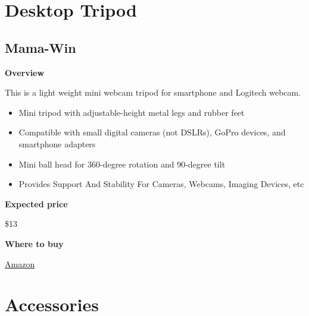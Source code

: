 \section{Desktop Tripod}
\label{sec:equipment::tripod}

\subsection{Mama-Win}
\label{sec:equipment::tripod::mamawin}

\begin{gram}
\label{grm:equipment::tripod::mamawin::main}

\textbf{Overview}

This is a light weight mini webcam tripod for smartphone and Logitech webcam.
%
\begin{itemize}
\item
Mini tripod with adjustable-height metal legs and rubber feet

\item
Compatible with small digital cameras (not DSLRs), GoPro devices, and smartphone adapters 

\item
Mini ball head for 360-degree rotation and 90-degree tilt

\item
Provides Support And Stability For Cameras, Webcams, Imaging Devices, etc

\end{itemize}



\textbf{Expected price}

\$13

\textbf{Where to buy}

\href{https://www.amazon.com/Lightweight-Webcam-Tripod-Logitech-Camera/dp/B076SHC6RN/ref=sr_1_1_sspa?crid=2T6CQ3HNRR1XR&keywords=logitech+c920&qid=1582900721&s=electronics&sprefix=logitech+c,electronics,172&sr=1-1-spons&psc=1&spLa=ZW5jcnlwdGVkUXVhbGlmaWVyPUE1VjVUUFpKTU83QUkmZW5jcnlwdGVkSWQ9QTA1NTk1OTVLT1IyTzdRRFVEWkImZW5jcnlwdGVkQWRJZD1BMDEyNzk2NzEyTDVSOEdSQ1QxTEgmd2lkZ2V0TmFtZT1zcF9hdGYmYWN0aW9uPWNsaWNrUmVkaXJlY3QmZG9Ob3RMb2dDbGljaz10cnVl}{Amazon}

\end{gram}


\section{Accessories}
\label{sec:equipment::accessories}

